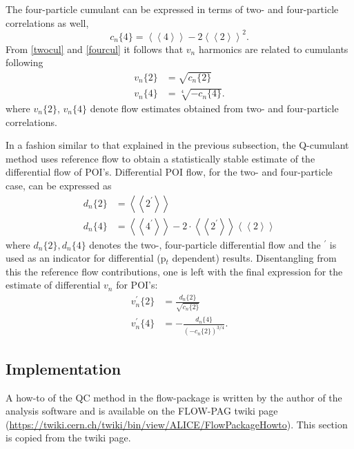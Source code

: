 \documentclass[a4paper]{book}
\numberwithin{equation}{subsection}
\begin{document}
	The four-particle cumulant can be expressed in terms of two- and four-particle correlations as well,
	\begin{equation}\label{fourcul}
		c_n\{4\} = \left< \left< 4 \right> \right> - 2 \left< \left< 2 \right> \right>^2.
	\end{equation}
	From \ref{twocul} and \ref{fourcul} it follows that $v_n$ harmonics are related to cumulants following
	\begin{align}\label{refFlowFromCumulants2nd}
		v_n\{2\} & = \sqrt{c_n\{2\}}                \\
		v_n\{4\} & = \sqrt[4]{-c_n\{4\}} \nonumber. 
	\end{align}
	where $v_n\{2\}$, $v_n\{4\}$ denote flow estimates obtained from two- and four-particle correlations.
		
	In a fashion similar to that explained in the previous subsection, the Q-cumulant method uses reference flow to obtain a statistically stable estimate of the differential flow of POI's. Differential POI flow, for the two- and four-particle case, can be expressed as
	\begin{align}
		d_n\{2\} & = \left< \left< 2^{\prime} \right> \right>                                                                                            \\
		d_n\{4\} & = \left< \left< 4^{\prime} \right> \right> - 2\cdotp \left< \left< 2^{\prime} \right> \right>\left< \left< 2 \right> \right>\nonumber 
	\end{align}
	where $d_n\{2\}, d_n\{4\}$ denotes the two-, four-particle differential flow and the $^{\prime}$ is used as an indicator for differential (p$_t$ dependent) results. Disentangling from this the reference flow contributions, one is left with the final expression for the estimate of differential $v_n$ for POI's:
	\begin{align}
		v_n^{\prime}\{2\} & = \frac{d_n\{2\}}{\sqrt{c_n\{2\}}}               \\
		v_n^{\prime}\{4\} & = - \frac{d_n\{4\}}{(-c_n\{2\})^{3/4}}.\nonumber 
	\end{align}
		
	\subsection{Implementation}
A how-to of the QC method in the flow-package is written by the author of the analysis software and is available on the FLOW-PAG twiki page (\href{https://twiki.cern.ch/twiki/bin/view/ALICE/FlowPackageHowto}{https://twiki.cern.ch/twiki/bin/view/ALICE/FlowPackageHowto}). This section is copied from the twiki page.
\end{document}
